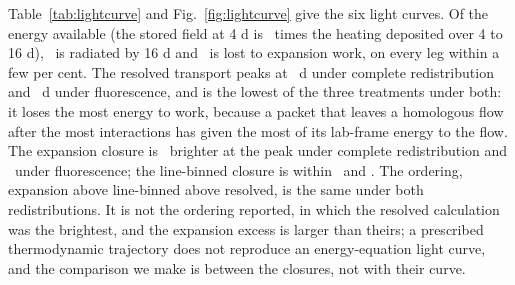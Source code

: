 \documentclass[fleqn,usenatbib]{mnras}
\begin{document}
Table~\ref{tab:lightcurve} and Fig.~\ref{fig:lightcurve} give the six light curves. Of the energy available (the stored field at 4 d is \LcInitHeatRatio\ times the heating deposited over 4 to 16 d), \LcEradFrac\ is radiated by 16 d and \LcWfrac\ is lost to expansion work, on every leg within a few per cent. The resolved transport peaks at \LcRthPeakD\ d under complete redistribution and \LcRtwoPeakD\ d under fluorescence, and is the lowest of the three treatments under both: it loses the most energy to work, because a packet that leaves a homologous flow after the most interactions has given the most of its lab-frame energy to the flow. The expansion closure is \LcBthDL\ brighter at the peak under complete redistribution and \LcBtwoDL\ under fluorescence; the line-binned closure is within \LcBbinthDL\ and \LcBbintwoDL. The ordering, expansion above line-binned above resolved, is the same under both redistributions. It is not the ordering \citet{fontes2020} reported, in which the resolved calculation was the brightest, and the expansion excess is larger than theirs; a prescribed thermodynamic trajectory does not reproduce an energy-equation light curve, and the comparison we make is between the closures, not with their curve.

\begin{table}
\caption{The Fontes light curve: peak time and luminosity, radiated energy, expansion work, the peak-luminosity excess over the resolved transport and the maximum colour residual, for the three treatments under both redistributions.}
\label{tab:lightcurve}

\end{table}
\end{document}
